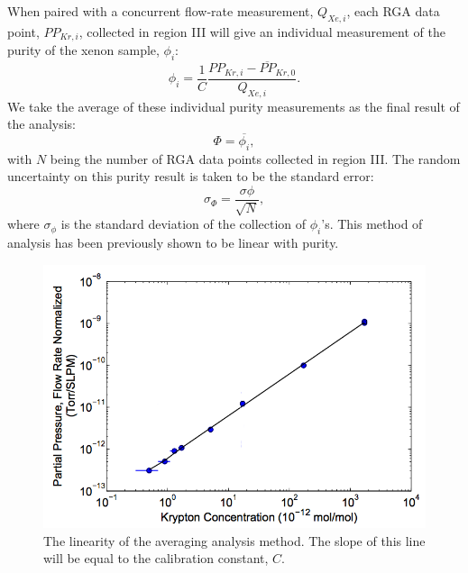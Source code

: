 When paired with a concurrent flow-rate measurement, $Q_{Xe,i}$, each RGA data point, $PP_{Kr,i}$, collected in region III will give an individual measurement of the purity of the xenon sample, $\phi_i$:
\begin{equation}
\phi_i=\frac{1}{C}\frac{PP_{Kr,i}-\overline{PP}_{Kr,0}}{Q_{Xe,i}}.
\label{eq:single_analysis}
\end{equation}
We take the average of these individual purity measurements as the final result of the analysis:
\begin{equation}
\Phi=\overline{\phi_i},
\label{eq:average_analysis}
\end{equation}
with $N$ being the number of RGA data points collected in region III. The random uncertainty on this purity result is taken to be the standard error:
\begin{equation}
\sigma_{\Phi}=\frac{\sigma{\phi}}{\sqrt{N}},
\label{eq:average_error}
\end{equation}
where $\sigma_{\phi}$ is the standard deviation of the collection of $\phi_i$'s. This method of analysis has been previously shown to be linear with purity. \cite{sampling_doug,sampling_dm,sampling_EXO}
\begin{figure}[h!]
  \includegraphics[width=\linewidth]{Figures/Lin_avg_Attila.png}
  \caption{The linearity of the averaging analysis method. The slope of this line will be equal to the calibration constant, $C$.\cite{sampling_dm} }
  \label{fig:linplot_attila}
\end{figure}

